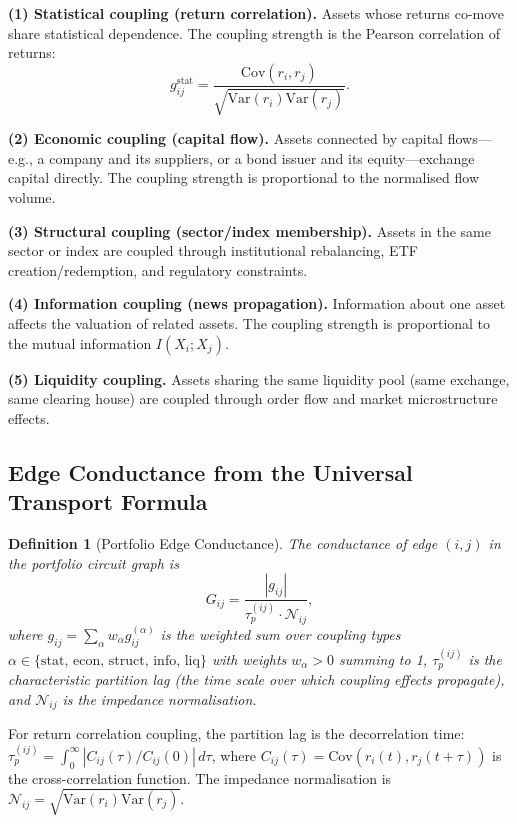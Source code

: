 \documentclass[twocolumn,10pt]{article}
\newtheorem{definition}[theorem]{Definition}
\theoremstyle{remark}
\begin{document}
\textbf{(1) Statistical coupling (return correlation).}  Assets whose returns co-move share statistical dependence.  The coupling strength is the Pearson correlation of returns:
\begin{equation}
    g_{ij}^{\text{stat}} = \frac{\text{Cov}(r_i, r_j)}{\sqrt{\text{Var}(r_i) \text{Var}(r_j)}}.
    \label{eq:stat_coupling}
\end{equation}

\textbf{(2) Economic coupling (capital flow).}  Assets connected by capital flows---e.g., a company and its suppliers, or a bond issuer and its equity---exchange capital directly.  The coupling strength is proportional to the normalised flow volume.

\textbf{(3) Structural coupling (sector/index membership).}  Assets in the same sector or index are coupled through institutional rebalancing, ETF creation/redemption, and regulatory constraints.

\textbf{(4) Information coupling (news propagation).}  Information about one asset affects the valuation of related assets.  The coupling strength is proportional to the mutual information $I(X_i; X_j)$.

\textbf{(5) Liquidity coupling.}  Assets sharing the same liquidity pool (same exchange, same clearing house) are coupled through order flow and market microstructure effects.

\subsection{Edge Conductance from the Universal Transport Formula}

\begin{definition}[Portfolio Edge Conductance]
\label{def:portfolio_conductance}
The \emph{conductance} of edge $(i,j)$ in the portfolio circuit graph is
\begin{equation}
    G_{ij} = \frac{|g_{ij}|}{\tau_p^{(ij)} \cdot \mathcal{N}_{ij}},
    \label{eq:portfolio_conductance}
\end{equation}
where $g_{ij} = \sum_{\alpha} w_\alpha g_{ij}^{(\alpha)}$ is the weighted sum over coupling types $\alpha \in \{\text{stat, econ, struct, info, liq}\}$ with weights $w_\alpha > 0$ summing to 1, $\tau_p^{(ij)}$ is the characteristic partition lag (the time scale over which coupling effects propagate), and $\mathcal{N}_{ij}$ is the impedance normalisation.
\end{definition}

For return correlation coupling, the partition lag is the decorrelation time: $\tau_p^{(ij)} = \int_0^\infty |C_{ij}(\tau)/C_{ij}(0)| \, d\tau$, where $C_{ij}(\tau) = \text{Cov}(r_i(t), r_j(t+\tau))$ is the cross-correlation function.  The impedance normalisation is $\mathcal{N}_{ij} = \sqrt{\text{Var}(r_i) \text{Var}(r_j)}$.
\end{document}
